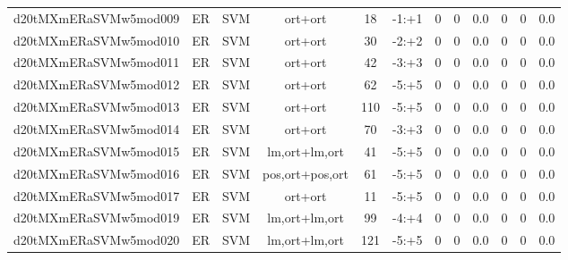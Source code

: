 \documentclass[a4paper]{article}
\begin{document}
\begin{landscape}
\begin{center}
\begin{tabular}{ |c|c|c|c|c|c|c|c|c|c|c|c|}
 
 	
 	\small{ d20tMXmERaSVMw5mod009 } & ER & SVM & ort+ort  &  18 &  -1:+1  &  0 & 0 & 0.0  &  0 & 0 & 0.0 \\
 	

 
 	
 	\small{ d20tMXmERaSVMw5mod010 } & ER & SVM & ort+ort  &  30 &  -2:+2  &  0 & 0 & 0.0  &  0 & 0 & 0.0 \\
 	

 
 	
 	\small{ d20tMXmERaSVMw5mod011 } & ER & SVM & ort+ort  &  42 &  -3:+3  &  0 & 0 & 0.0  &  0 & 0 & 0.0 \\
 	

 
 	
 	\small{ d20tMXmERaSVMw5mod012 } & ER & SVM & ort+ort  &  62 &  -5:+5  &  0 & 0 & 0.0  &  0 & 0 & 0.0 \\
 	

 
 	
 	\small{ d20tMXmERaSVMw5mod013 } & ER & SVM & ort+ort  &  110 &  -5:+5  &  0 & 0 & 0.0  &  0 & 0 & 0.0 \\
 	

 
 	
 	\small{ d20tMXmERaSVMw5mod014 } & ER & SVM & ort+ort  &  70 &  -3:+3  &  0 & 0 & 0.0  &  0 & 0 & 0.0 \\
 	

 
 	
 	\small{ d20tMXmERaSVMw5mod015 } & ER & SVM & lm,ort+lm,ort  &  41 &  -5:+5  &  0 & 0 & 0.0  &  0 & 0 & 0.0 \\
 	

 
 	
 	\small{ d20tMXmERaSVMw5mod016 } & ER & SVM & pos,ort+pos,ort  &  61 &  -5:+5  &  0 & 0 & 0.0  &  0 & 0 & 0.0 \\
 	

 
 	
 	\small{ d20tMXmERaSVMw5mod017 } & ER & SVM & ort+ort  &  11 &  -5:+5  &  0 & 0 & 0.0  &  0 & 0 & 0.0 \\
 	

 
 	
 	\small{ d20tMXmERaSVMw5mod019 } & ER & SVM & lm,ort+lm,ort  &  99 &  -4:+4  &  0 & 0 & 0.0  &  0 & 0 & 0.0 \\
 	

 
 	
 	\small{ d20tMXmERaSVMw5mod020 } & ER & SVM & lm,ort+lm,ort  &  121 &  -5:+5  &  0 & 0 & 0.0  &  0 & 0 & 0.0 \\
 	


\end{tabular}
\end{center}
\end{landscape}
\end{document}
